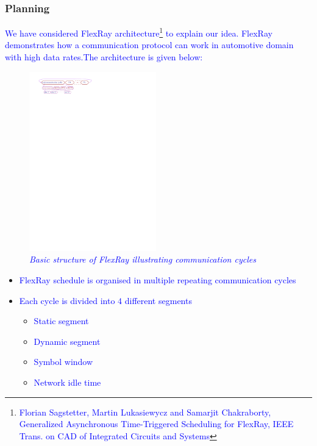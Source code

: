 \begin{frame}
\frametitle{ Planning }
\tiny{\textcolor{blue} {We have considered FlexRay architecture\footnote{\tiny{\textcolor{blue}{Florian Sagstetter,
               Martin Lukasiewycz and
               Samarjit Chakraborty, Generalized Asynchronous Time-Triggered Scheduling for FlexRay, {IEEE} Trans. on {CAD} of Integrated Circuits and Systems}}} to explain our idea.
FlexRay demonstrates how a communication protocol can work in 
automotive domain with high data rates.The architecture is given below:}}

\begin{figure}
\begin{center}
\includegraphics[width=55mm]{Flex_Ray.pdf}
\end{center}
\caption{{\em \tiny{\textcolor{blue}{Basic  structure of FlexRay illustrating communication cycles}}}} \label{fig1}
\end{figure}

\begin{itemize}
 \item \tiny{\textcolor{blue}{FlexRay schedule is organised in multiple  repeating communication cycles}}
 \item \tiny{\textcolor{blue}{Each cycle is divided into $4$ different segments}}
        \begin{itemize}
              \item \tiny{\textcolor{blue} {Static segment}}
              \item \tiny{\textcolor{blue} {Dynamic segment}}
              \item \tiny{\textcolor{blue} {Symbol window}}
              \item \tiny{\textcolor{blue} {Network idle time}}
        \end{itemize}
        

\end{itemize}
\end{frame}
